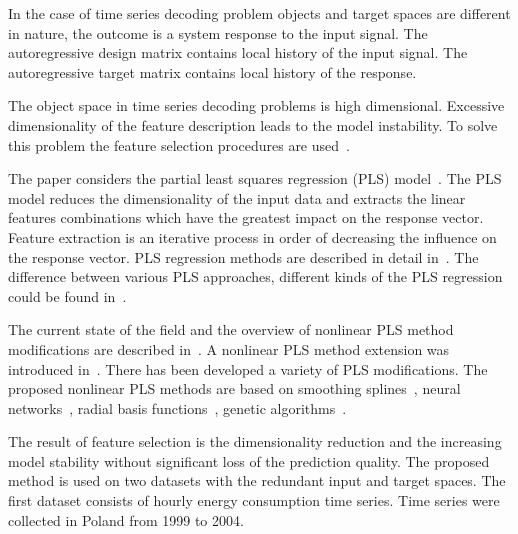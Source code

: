 \documentclass[12pt,twoside]{article}
\begin{document}
In the case of time series decoding problem objects and target spaces are different in nature, the outcome is a system response to the input signal.
The autoregressive design matrix contains local history of the input signal.
The autoregressive target matrix contains local history of the response.

The object space in time series decoding problems is high dimensional.
Excessive dimensionality of the feature description leads to the model instability.
To solve this problem the feature selection procedures are used~\cite{katrutsa2015qpfs,li2016feature}.

The paper considers the partial least squares regression (PLS) model~\cite{wegelin2000survey,abdi2003pls,geladi1986partial}.
The PLS model reduces the dimensionality of the input data and extracts the linear features combinations which have the greatest impact on the response vector.
Feature extraction is an iterative process in order of decreasing the influence on the response vector.
PLS regression methods are described in detail in~\cite{geladi1988pls, hoskuldsson1988plsr,de1993simpls}.
The difference between various PLS approaches, different kinds of the PLS regression could be found in~\cite{rosipal2006overview}.

The current state of the field and the overview of nonlinear PLS method modifications are described in~\cite{rosipal2011npls}.
A nonlinear PLS method extension was introduced in~\cite{wold1989nonlinear}.
There has been developed a variety of PLS modifications.
The proposed nonlinear PLS methods are based on smoothing splines~\cite{frank1990npls}, neural networks~\cite{qin1992npls}, radial basis functions~\cite{yan2003geneticpls}, genetic algorithms~\cite{hiden1998geneticpls}.

The result of feature selection is the dimensionality reduction and the increasing model stability without significant loss of the prediction quality.
The proposed method is used on two datasets with the redundant input and target spaces.
The first dataset consists of hourly energy consumption time series. 
Time series were collected in Poland from 1999 to 2004.
\end{document}
